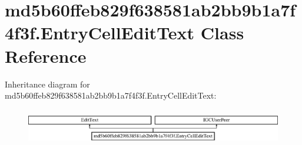 \hypertarget{classmd5b60ffeb829f638581ab2bb9b1a7f4f3f_1_1EntryCellEditText}{}\section{md5b60ffeb829f638581ab2bb9b1a7f4f3f.\+Entry\+Cell\+Edit\+Text Class Reference}
\label{classmd5b60ffeb829f638581ab2bb9b1a7f4f3f_1_1EntryCellEditText}
Inheritance diagram for md5b60ffeb829f638581ab2bb9b1a7f4f3f.\+Entry\+Cell\+Edit\+Text\+:\begin{figure}[H]
\begin{center}
\leavevmode
\includegraphics[height=1.604584cm]{classmd5b60ffeb829f638581ab2bb9b1a7f4f3f_1_1EntryCellEditText}
\end{center}
\end{figure}
